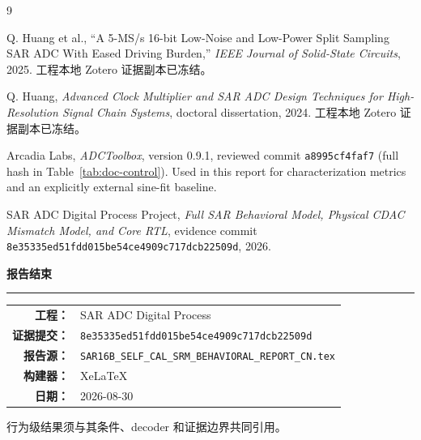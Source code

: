 \documentclass[UTF8,fontset=none,a4paper,11pt,openany]{ctexrep}
\newcommand{\EvidenceCommit}{8e35335ed51fdd015be54ce4909c717dcb22509d}
\begin{document}
\clearpage
\begin{thebibliography}{9}

Q. Huang et al., ``A 5-MS/s 16-bit Low-Noise and Low-Power Split Sampling SAR ADC With Eased Driving Burden,'' \emph{IEEE Journal of Solid-State Circuits}, 2025. 工程本地 Zotero 证据副本已冻结。

Q. Huang, \emph{Advanced Clock Multiplier and SAR ADC Design Techniques for High-Resolution Signal Chain Systems}, doctoral dissertation, 2024. 工程本地 Zotero 证据副本已冻结。

Arcadia Labs, \emph{ADCToolbox}, version 0.9.1, reviewed commit \texttt{a8995cf4faf7} (full hash in Table~\ref{tab:doc-control}). Used in this report for characterization metrics and an explicitly external sine-fit baseline.

SAR ADC Digital Process Project, \emph{Full SAR Behavioral Model, Physical CDAC Mismatch Model, and Core RTL}, evidence commit \texttt{\EvidenceCommit}, 2026.

\end{thebibliography}

\clearpage
\thispagestyle{empty}
\vspace*{0.22\textheight}
\begin{center}
{\ReferenceCJKTitle\bfseries\fontsize{17.22}{27}\selectfont 报告结束}\par
\vspace{0.8cm}
{\color{RefNavy}\rule{0.18\textwidth}{1.0pt}}\par
\vspace{1.0cm}
\begin{tabular}{rl}
\textbf{工程：} & SAR ADC Digital Process\\
\textbf{证据提交：} & \texttt{\EvidenceCommit}\\
\textbf{报告源：} & \texttt{SAR16B\_SELF\_CAL\_SRM\_BEHAVIORAL\_REPORT\_CN.tex}\\
\textbf{构建器：} & XeLaTeX\\
\textbf{日期：} & 2026-08-30\\
\end{tabular}
\vfill
{\small 行为级结果须与其条件、decoder 和证据边界共同引用。}
\end{center}
\end{document}
